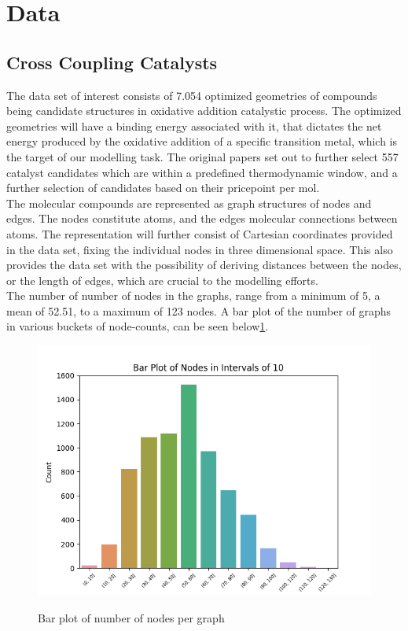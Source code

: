\section{Data}\label{sec:data}

\subsection{Cross Coupling Catalysts}

The data set of interest consists of 7.054 optimized geometries of compounds being candidate structures in oxidative addition 
catalystic process. The optimized geometries will have a binding energy associated with it, that dictates the net energy 
produced by the oxidative addition of a specific transition metal\cite{Meyer2018}, which is the target of our modelling task. 
The original papers set out to further select 557 catalyst candidates which are within a predefined thermodynamic window, and a 
further selection of candidates based on their pricepoint per mol.\\

The molecular compounds are represented as graph structures of nodes and edges. The nodes constitute atoms, and the edges molecular 
connections between atoms. The representation will further consist of Cartesian coordinates provided in the data set, fixing the 
individual nodes in three dimensional space. This also provides the data set with the possibility of deriving distances between the 
nodes, or the length of edges, which are crucial to the modelling efforts.\\ 

The number of number of nodes in the graphs, range from a minimum of 5, a mean of 52.51, to a maximum of 123 nodes. 
A bar plot of the number of graphs in various buckets of node-counts, can be seen below\ref{num_nodes}.\\

\begin{figure}[H]
\caption{Bar plot of number of nodes per graph}
\centering\label{num_nodes}
\includegraphics[width=\textwidth]{Images/Data/num_nodes_dataset.png}
\end{figure}

